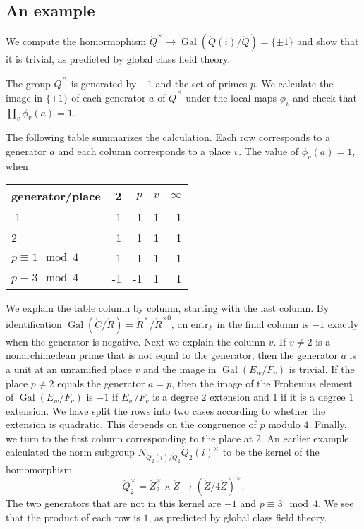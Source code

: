 \documentclass{amsart}
\def\op#1{{\operatorname{#1}}}
\def\CC{\ring{C}}
\def\RR{\ring{R}}
\def\ZZ{\ring{Z}}
\def\QQ{\ring{Q}}
\def\oG{\op{Gal}}
\begin{document}
\subsection{An example}

We compute the homormophism $\QQ^\times\to \oG(\QQ(i)/\QQ)=\{\pm1\}$ and show that
it is trivial, as predicted by global class field theory.

The group  $\QQ^\times$ is  generated by $-1$ and the set of primes $p$.
We calculate the image in $\{\pm1\}$ of each generator $a$ of $\QQ^\times$ 
under the local maps $\phi_v$ and check that $\prod_v \phi_v(a) = 1$.

The following table summarizes the calculation.  Each row corresponds to a generator $a$
and each column corresponds to a place $v$. The value of $\phi_v(a)=1$, when

\begin{centering}
\begin{tabular}{l || r | r | r | r}
generator/place     & 2 & $p$ & $v$ & $\infty$ \\
\hline 
-1 & -1 & 1 &  1 & -1 \\
2  & 1 & 1 & 1 & 1 \\
$p\equiv 1\mod 4$  & 1 & 1 & 1 & 1\\
$p\equiv 3 \mod 4$ & -1 & -1 & 1 & 1
\end{tabular}
\end{centering}

We explain the table column by column, starting with the last
column. By identification $\oG(\CC/\RR) = \RR^\times/\RR^{\times\!0}$,
an entry in the final column is $-1$ exactly when the generator is
negative.  Next we explain the column $v$.  If $v\ne 2$ is a
nonarchimedean prime that is not equal to the generator, then the
generator $a$ is a unit at an unramified place $v$ and the image in
$\oG(E_w/F_v)$ is trivial.  If the place $p\ne 2$ equals the generator
$a=p$, then the image of the Frobenius element of $\oG(E_w/F_v)$ is
$-1$ if $E_w/F_v$ is a degree $2$ extension and $1$ if it is a degree
$1$ extension.  We have split the rows into two cases according to
whether the extension is quadratic. This depends on the congruence of
$p$ modulo $4$.   Finally, we turn to the first column corresponding to the place at $2$.  
An earlier
example calculated the norm subgroup $N_{\QQ_2(i)/\QQ_2}
\QQ_2(i)^\times$ to be the kernel of the homomorphism
\[
\QQ_2^\times = \ZZ_2^\times \times \ZZ \to (\ZZ/4\ZZ)^\times.
\]
The two generators that are not in this kernel are $-1$ and $p\equiv 3
\mod 4$.  We see that the product of each row is $1$, as predicted by
global class field theory.
\end{document}
